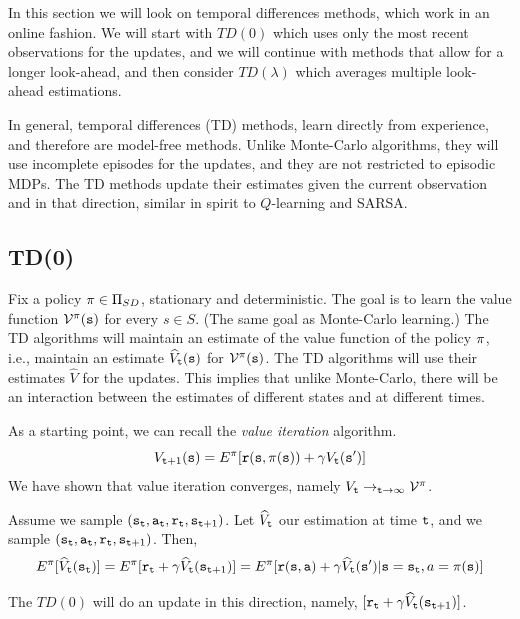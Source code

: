 In this section we will look on temporal differences methods, which
work in an online fashion. We will start with $TD(0)$ which uses
only the most recent observations for the updates, and we will
continue with methods that allow for a longer look-ahead, and then
consider $TD(\lambda)$ which averages multiple look-ahead
estimations.

In general, temporal differences (TD) methods, learn directly from
experience, and therefore are model-free methods. Unlike Monte-Carlo
algorithms, they will use incomplete episodes for the updates, and
they are not restricted to episodic MDPs. The TD methods update
their estimates given the current observation and in that direction,
similar in spirit to $Q$-learning and SARSA.

\subsection{TD(0)}

Fix a policy $\pi\in \Pi_{SD}$, stationary and deterministic. The goal
is to learn the value function $\mathcal{V}^\pi({\tt s})$ for every
$s\in S$. (The same goal as Monte-Carlo learning.) The TD algorithms
will maintain an estimate of the value function of the policy
$\pi$, i.e., maintain an estimate $\widehat{V}_{\tt t}({\tt s})$
for $\mathcal{V}^\pi({\tt s})$. The TD algorithms will use their
estimates $\widehat{V}$ for the updates. This implies that unlike
Monte-Carlo, there will be an interaction between the estimates of
different states and at different times.

As a starting point, we can recall the {\em value iteration}
algorithm.
\[
V_{{\tt t}+1}({\tt s})=E^\pi[{\tt r}({\tt s},\pi({\tt s}))+\gamma
V_{\tt t}({\tt s}')]
\]
We have shown that value iteration converges, namely $V_{\tt t}
\rightarrow_{{\tt t}\rightarrow\infty} \mathcal{V}^\pi$.

Assume we sample
$({\tt s}_{\tt t},{\tt a}_{\tt t},{\tt r}_{\tt t},{\tt s}_{{\tt t}+1})$.
Let $\widehat{V}_{\tt t}$ our estimation at time ${\tt t}$,
and we sample
$({\tt s}_{\tt t},{\tt a}_{\tt t},{\tt r}_{\tt t},{\tt s}_{{\tt t}+1})$.
Then,
\[
E^\pi[\widehat{V}_{\tt t}({\tt s}_{\tt t})]=
E^\pi[{\tt r}_{\tt t}+\gamma
\widehat{V}_{\tt t}({\tt s}_{{\tt t}+1})]=E^\pi[{\tt r}({\tt s},{\tt a})+\gamma
\widehat{V}_{\tt t}({\tt s}')|{\tt s}={\tt s}_{\tt t},a=\pi({\tt s})]
\]

The $TD(0)$ will do an update in this direction, namely,
$[{\tt r}_{\tt t}+\gamma \widehat{V}_{\tt t}({\tt s}_{{\tt t}+1})]$.

